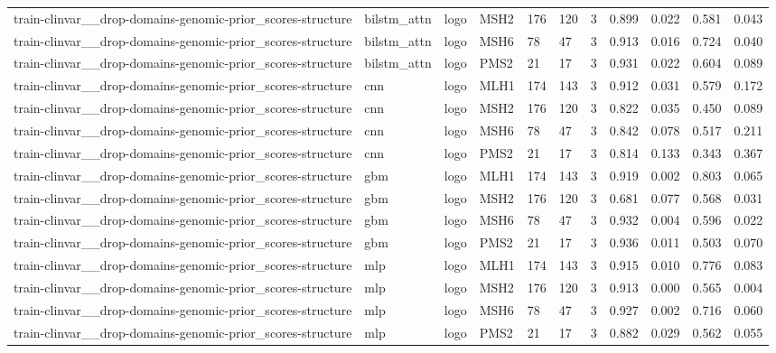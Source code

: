 \begin{table}[t]
\begin{tabular}{lllllllllll}
train-clinvar\_\_drop-domains-genomic-prior\_scores-structure & bilstm\_attn & logo & MSH2 & 176 & 120 & 3 & 0.899 & 0.022 & 0.581 & 0.043 \\
train-clinvar\_\_drop-domains-genomic-prior\_scores-structure & bilstm\_attn & logo & MSH6 & 78 & 47 & 3 & 0.913 & 0.016 & 0.724 & 0.040 \\
train-clinvar\_\_drop-domains-genomic-prior\_scores-structure & bilstm\_attn & logo & PMS2 & 21 & 17 & 3 & 0.931 & 0.022 & 0.604 & 0.089 \\
train-clinvar\_\_drop-domains-genomic-prior\_scores-structure & cnn & logo & MLH1 & 174 & 143 & 3 & 0.912 & 0.031 & 0.579 & 0.172 \\
train-clinvar\_\_drop-domains-genomic-prior\_scores-structure & cnn & logo & MSH2 & 176 & 120 & 3 & 0.822 & 0.035 & 0.450 & 0.089 \\
train-clinvar\_\_drop-domains-genomic-prior\_scores-structure & cnn & logo & MSH6 & 78 & 47 & 3 & 0.842 & 0.078 & 0.517 & 0.211 \\
train-clinvar\_\_drop-domains-genomic-prior\_scores-structure & cnn & logo & PMS2 & 21 & 17 & 3 & 0.814 & 0.133 & 0.343 & 0.367 \\
train-clinvar\_\_drop-domains-genomic-prior\_scores-structure & gbm & logo & MLH1 & 174 & 143 & 3 & 0.919 & 0.002 & 0.803 & 0.065 \\
train-clinvar\_\_drop-domains-genomic-prior\_scores-structure & gbm & logo & MSH2 & 176 & 120 & 3 & 0.681 & 0.077 & 0.568 & 0.031 \\
train-clinvar\_\_drop-domains-genomic-prior\_scores-structure & gbm & logo & MSH6 & 78 & 47 & 3 & 0.932 & 0.004 & 0.596 & 0.022 \\
train-clinvar\_\_drop-domains-genomic-prior\_scores-structure & gbm & logo & PMS2 & 21 & 17 & 3 & 0.936 & 0.011 & 0.503 & 0.070 \\
train-clinvar\_\_drop-domains-genomic-prior\_scores-structure & mlp & logo & MLH1 & 174 & 143 & 3 & 0.915 & 0.010 & 0.776 & 0.083 \\
train-clinvar\_\_drop-domains-genomic-prior\_scores-structure & mlp & logo & MSH2 & 176 & 120 & 3 & 0.913 & 0.000 & 0.565 & 0.004 \\
train-clinvar\_\_drop-domains-genomic-prior\_scores-structure & mlp & logo & MSH6 & 78 & 47 & 3 & 0.927 & 0.002 & 0.716 & 0.060 \\
train-clinvar\_\_drop-domains-genomic-prior\_scores-structure & mlp & logo & PMS2 & 21 & 17 & 3 & 0.882 & 0.029 & 0.562 & 0.055 \\

\end{tabular}
\end{table}
